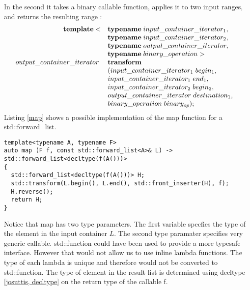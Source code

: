 \documentclass[12pt,fleqn]{article}
\begin{document}
In the second it takes a binary callable function, applies it to  two input ranges, and returns the resulting range :
\[
\begin{array}{rll}
\mbox{\bf template}<& \mbox{\bf typename}\; input\_container\_iterator_1, \\
                &\mbox{\bf typename}\; input\_container\_iterator_2, \\
               &\mbox{\bf typename} \; output \_container\_iterator, \\
             &\mbox{\bf typename} \; binary\_operation> &\\
output\_container\_iterator\;& \mbox{\bf transform}\\
&( input\_container\_iterator_1\; begin_1, \\
& input\_container\_iterator_1 \; end_1, \\
&input\_container\_iterator_2\; begin_2, \\
& output\_container\_iterator \; destination_1, \\
& binary\_operation \; binary_{op} );
\end{array}
\]
Listing \ref{map} shows a possible implementation of the map function for a std::forward\_list.

\begin{lstlisting}[caption=map for std::forward\_list,label=map]
template<typename A, typename F>
auto map (F f, const std::forward_list<A>& L) -> std::forward_list<decltype(f(A()))>
{
  std::forward_list<decltype(f(A()))> H;
  std::transform(L.begin(), L.end(), std::front_inserter(H), f);
  H.reverse();
  return H;
}
\end{lstlisting}

Notice that map has two type parameters. 
The first variable specfies the type of the element in the input container $L$.  
The second type paramater specifies very generic callable. 
std::function could have been used to provide a more typesafe interface.
However that would not allow us to use inline lambda functions.
The type of each lambda is unique and therefore would not be converted to std::function.
The type of element in the result list is determined using decltype \ref{josuttis, decltype} on the return type of the callable f.
\end{document}
